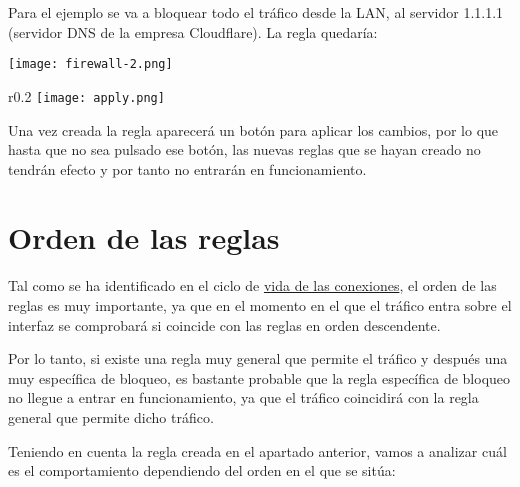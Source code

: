 Para el ejemplo se va a bloquear todo el tráfico desde la LAN, al servidor 1.1.1.1 (servidor DNS de la empresa Cloudflare). La regla quedaría:

\begin{center}
    \vspace{-10pt}
    \texttt{[image: firewall-2.png]}
    \vspace{-20pt}
\end{center}


\begin{wrapfigure}{r}{0.2\linewidth}
    \centering
    \vspace{-10pt}
    \texttt{[image: apply.png]}
\end{wrapfigure}
Una vez creada la regla aparecerá un botón para aplicar los cambios, por lo que hasta que no sea pulsado ese botón, las nuevas reglas que se hayan creado no tendrán efecto y por tanto no entrarán en funcionamiento.


\section{Orden de las reglas}
Tal como se ha identificado en el ciclo de \hyperlink{ciclo_vida_conexiones}{vida de las conexiones}, el orden de las reglas es muy importante, ya que en el momento en el que el tráfico entra sobre el interfaz se comprobará si coincide con las reglas en orden descendente.

Por lo tanto, si existe una regla muy general que permite el tráfico y después una muy específica de bloqueo, es bastante probable que la regla específica de bloqueo no llegue a entrar en funcionamiento, ya que el tráfico coincidirá con la regla general que permite dicho tráfico.

Teniendo en cuenta la regla creada en el apartado anterior, vamos a analizar cuál es el comportamiento dependiendo del orden en el que se sitúa:

